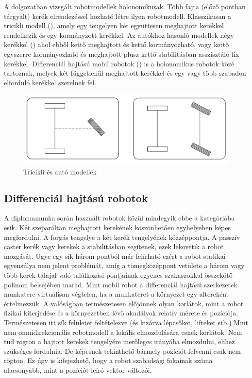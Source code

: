 A dolgozatban vizsgált robotmodellek holonomikusak. Több fajta (előző pontban tárgyalt) kerék elrendezéssel hozható létre ilyen robotmodell. Klasszikusan a tricikli modell (), amely egy tengelyen két együttesen meghajtott kerékkel rendelkezik és egy kormányzott kerékkel. Az autókhoz hasonló modellek négy kerékkel () ahol ebből kettő meghajtott és kettő kormányozható, vagy kettő egyszerre kormányozható és meghajtott plusz kettő stabilitásban asszisztáló fix kerékkel. Differenciál hajtású mobil robotok () is a holonomikus robotok közé tartoznak, melyek két függetlenül meghajtott kerékkel és egy vagy több szabadon elforduló kerékkel szerelnek fel.  \cite{siciliano2010robotics} \cite{ros2_control_docs}

\begin{figure}[!ht]
    \centering
    \includegraphics[width=150mm, keepaspectratio]{figures/024_tricikli_car.png}
    \caption{Tricikli és autó modellek \cite{siciliano2010robotics}}
    \label{fig:024_tricikli_car}
\end{figure}

\subsection{Differenciál hajtású robotok}
A diplomamunka során használt robotok közül mindegyik ebbe a kategóriába esik. Két szeparáltan meghajtott kerekének köszönhetően egyhelyeben képes megfordulni. A forgás tengelye a két kerék tengelyének közzéppontja. A passzív caster kerék vagy kerekek a stabilitásban segítenek, ezek lekövetik a robot mozgását. Ugye egy sík három pontból már felírható ezért a robot statikai egyensúlya nem jelent problémát, amíg a tömegközéppont vetülete a három vagy több kerek talajal való találkozási pontjainak egyenes szakaszokkal összekötő polinom belsejében marad. Mint mobil robot a differenciál hajtású szerkezetek munkatere virtuálisan végtelen, ha a munkateret a környezet egy altereként értelmezzük. A valóságban természetesen előjönnek olyan korlátok, mint a robot fizikai kiterjedése és a környezetben lévő akadályok relatív mérete és pozíciója. Természetesen itt sík felületet feltételezve (és kizárva lépcsőket, lifteket stb.) Mint nem omnidirekcionális robotmodell a lokális elmozdulására esnek korlátok. Nem tud rögtön a hajtott kerekek tengelyére merőleges irányába elmozdulni, ehhez szükséges fordulnia. De képesnek tekinthető bármely pozíciót felvenni csak nem rögtön. Ez úgy is kifejezhető, hogy a robot szabadsági fokainak száma alacsonyabb, mint a pozíciót leíró vektor változói. \cite{siciliano2010robotics} \cite{ros2_control_docs}

